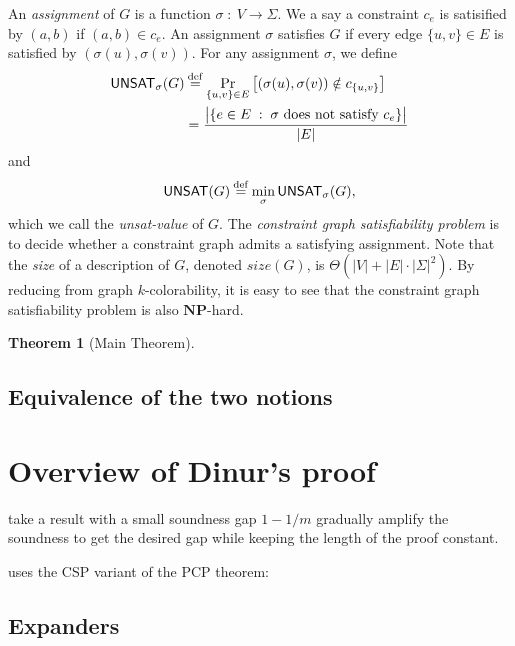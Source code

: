 \documentclass{article}
\newtheorem{theorem}{Theorem}
\newtheorem{example}[theorem]{Example}
\newcommand{\class}[1]{\mathbf{#1}}
\newcommand{\NP}{\class{NP}}
\newcommand{\UNSAT}{\mathsf{UNSAT}}
\newcommand{\eqdef}{\mathbin{\stackrel{\rm def}{=}}}
\begin{document}
An \emph{assignment} of $G$ is a function $\sigma \;:\: V \to \Sigma$.
We a say a constraint $c_e$ is satisified by $(a, b)$ if $(a, b) \in c_e$. 
An assignment $\sigma$ satisfies $G$ if every edge $\{u, v\} \in E$
is satisfied by $(\sigma(u), \sigma(v))$.
For any assignment $\sigma$, we define
\begin{align*}
\UNSAT_\sigma(G) &\eqdef \Pr_{\{u, v\} \in E} \big[(\sigma(u), \sigma(v)) \notin c_{\{u, v\}}\big] \\
  &= \frac{\big|\{e \in E \;:\; \sigma \text{ does not satisfy } c_e\}\big|}{|E|}
\end{align*}
and
$$
\UNSAT(G) \eqdef \min_\sigma \UNSAT_\sigma(G),
$$
which we call the \emph{unsat-value} of $G$.
The \emph{constraint graph satisfiability problem} is to decide whether
a constraint graph admits a satisfying assignment.
Note that the \emph{size} of a description of $G$, denoted $size(G)$, is $\Theta(|V|+|E|\cdot|\Sigma|^2)$.
By reducing from graph $k$-colorability, it is easy to see that
the constraint graph satisfiability problem is also $\NP$-hard.


\begin{theorem}[Main Theorem]

\end{theorem}

\subsection{Equivalence of the two notions}

\section{Overview of Dinur's proof}\label{proof}

take a result with a small soundness gap $1 - 1/m$
gradually amplify the soundness to get the
desired gap while keeping the length of the proof constant.

uses the CSP variant of the PCP theorem:

\subsection{Expanders}
\end{document}
